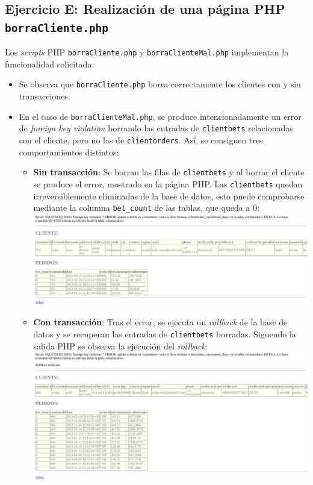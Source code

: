 \documentclass{article}
\begin{document}
\subsection{Ejercicio E: {\small Realización de una página PHP \texttt{borraCliente.php}}}
Los \textit{scripts} PHP \texttt{borraCliente.php} y \texttt{borraClienteMal.php} implementan la funcionalidad solicitada:
\begin{itemize}
    \item Se observa que \texttt{borraCliente.php} borra correctamente los clientes con y sin transacciones.
    \item En el caso de \texttt{borraClienteMal.php}, se produce intencionadamente un error de \textit{foreign key violation} borrando las entradas de \texttt{clientbets} relacionadas con el cliente, pero no las de \texttt{clientorders}. Así, se consiguen tres comportamientos distintos:
        \begin{itemize}
            \item \textbf{Sin transacción}: Se borran las filas de \texttt{clientbets} y al borrar el cliente se produce el error, mostrado en la página PHP. Las \texttt{clientbets} quedan irreversiblemente eliminadas de la base de datos, esto puede comprobarse mediante la columna \texttt{bet\_count} de las tablas, que queda a 0:
                \smallbreak
                \includegraphics[width=\linewidth]{img/trans}
            \item \textbf{Con transacción}: Tras el error, se ejecuta un \textit{rollback} de la base de datos y se recuperan las entradas de \texttt{clientbets} borradas. Siguendo la salida PHP se observa la ejecución del \textit{rollback}:
                \smallbreak
                \includegraphics[width=\linewidth]{img/trans_rollback}

\end{itemize}
\end{itemize}
\end{document}
